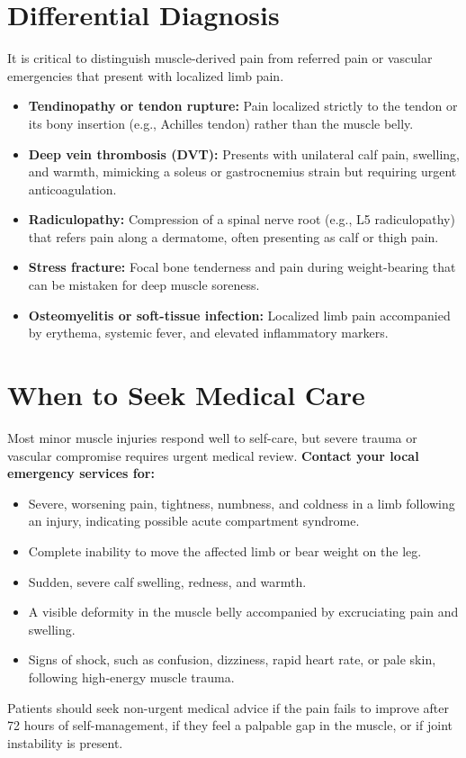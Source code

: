 \section*{Differential Diagnosis}
It is critical to distinguish muscle-derived pain from referred pain or vascular emergencies that present with localized limb pain.
\begin{itemize}
    \item \textbf{Tendinopathy or tendon rupture:} Pain localized strictly to the tendon or its bony insertion (e.g., Achilles tendon) rather than the muscle belly.
    \item \textbf{Deep vein thrombosis (DVT):} Presents with unilateral calf pain, swelling, and warmth, mimicking a soleus or gastrocnemius strain but requiring urgent anticoagulation.
    \item \textbf{Radiculopathy:} Compression of a spinal nerve root (e.g., L5 radiculopathy) that refers pain along a dermatome, often presenting as calf or thigh pain.
    \item \textbf{Stress fracture:} Focal bone tenderness and pain during weight-bearing that can be mistaken for deep muscle soreness.
    \item \textbf{Osteomyelitis or soft-tissue infection:} Localized limb pain accompanied by erythema, systemic fever, and elevated inflammatory markers.
\end{itemize}

\section*{When to Seek Medical Care}
Most minor muscle injuries respond well to self-care, but severe trauma or vascular compromise requires urgent medical review.
\textbf{Contact your local emergency services for:}
\begin{itemize}
    \item Severe, worsening pain, tightness, numbness, and coldness in a limb following an injury, indicating possible acute compartment syndrome.
    \item Complete inability to move the affected limb or bear weight on the leg.
    \item Sudden, severe calf swelling, redness, and warmth.
    \item A visible deformity in the muscle belly accompanied by excruciating pain and swelling.
    \item Signs of shock, such as confusion, dizziness, rapid heart rate, or pale skin, following high-energy muscle trauma.
\end{itemize}
Patients should seek non-urgent medical advice if the pain fails to improve after 72 hours of self-management, if they feel a palpable gap in the muscle, or if joint instability is present.

